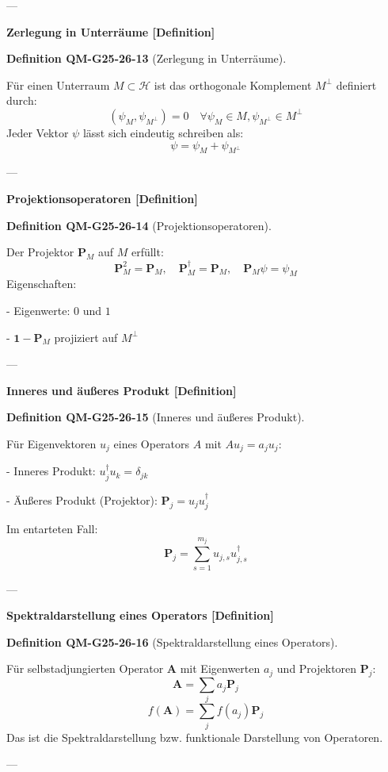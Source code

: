 \documentclass[10pt, letterpaper]{article}
\newcommand{\CustomHeading}[3]{%
  \par\medskip\noindent%
  \textbf{#1 #2} \textnormal{(#3)}.\enskip%
}
\newenvironment{DEF}[2]{\begin{unitbox}\CustomHeading{Definition}{#1}{#2}}{\end{unitbox}}
\begin{document}
---

\textbf{Zerlegung in Unterräume [Definition]}

\begin{DEF}{QM-G25-26-13}{Zerlegung in Unterräume}
Für einen Unterraum $M \subset \mathcal{H}$ ist das orthogonale Komplement $M^\perp$ definiert durch:
\[
(\psi_M, \psi_{M^\perp}) = 0 \quad \forall \psi_M \in M, \psi_{M^\perp} \in M^\perp
\]
Jeder Vektor $\psi$ lässt sich eindeutig schreiben als:
\[
\psi = \psi_M + \psi_{M^\perp}
\]
\end{DEF}

---

\textbf{Projektionsoperatoren [Definition]}

\begin{DEF}{QM-G25-26-14}{Projektionsoperatoren}
Der Projektor $\mathbf{P}_M$ auf $M$ erfüllt:
\[
\mathbf{P}_M^2 = \mathbf{P}_M, \quad \mathbf{P}_M^\dagger = \mathbf{P}_M, \quad \mathbf{P}_M \psi = \psi_M
\]
Eigenschaften:

- Eigenwerte: $0$ und $1$

- $\mathbf{1} - \mathbf{P}_M$ projiziert auf $M^\perp$
\end{DEF}

---

\textbf{Inneres und äußeres Produkt [Definition]}

\begin{DEF}{QM-G25-26-15}{Inneres und äußeres Produkt}
Für Eigenvektoren $u_j$ eines Operators $A$ mit $A u_j = a_j u_j$:

- Inneres Produkt: $u_j^\dagger u_k = \delta_{jk}$

- Äußeres Produkt (Projektor): $\mathbf{P}_j = u_j u_j^\dagger$

Im entarteten Fall:
\[
\mathbf{P}_j = \sum_{s=1}^{m_j} u_{j,s} u_{j,s}^\dagger
\]
\end{DEF}

---

\textbf{Spektraldarstellung eines Operators [Definition]}

\begin{DEF}{QM-G25-26-16}{Spektraldarstellung eines Operators}
Für selbstadjungierten Operator $\mathbf{A}$ mit Eigenwerten $a_j$ und Projektoren $\mathbf{P}_j$:
\[
\mathbf{A} = \sum_j a_j \mathbf{P}_j
\]
\[
f(\mathbf{A}) = \sum_j f(a_j) \mathbf{P}_j
\]
Das ist die Spektraldarstellung bzw. funktionale Darstellung von Operatoren.
\end{DEF}

---
\end{document}

